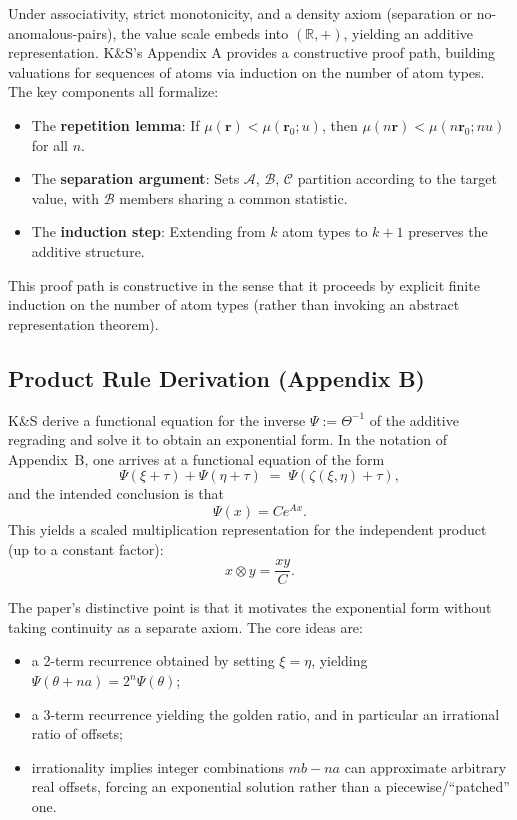 \documentclass[11pt]{article}
\begin{document}
Under associativity, strict monotonicity, and a density axiom (separation or no-anomalous-pairs),
the value scale embeds into $(\mathbb{R}, +)$, yielding an additive representation.
K\&S's Appendix A provides a constructive proof path, building valuations
for sequences of atoms via induction on the number of atom types. The key components
all formalize:

\begin{itemize}[noitemsep]
\item The \textbf{repetition lemma}: If $\mu(\mathbf{r}) < \mu(\mathbf{r}_0; u)$,
then $\mu(n\mathbf{r}) < \mu(n\mathbf{r}_0; nu)$ for all $n$.

\item The \textbf{separation argument}: Sets $\mathcal{A}$, $\mathcal{B}$, $\mathcal{C}$
partition according to the target value, with $\mathcal{B}$ members sharing a common
statistic.

\item The \textbf{induction step}: Extending from $k$ atom types to $k+1$ preserves
the additive structure.
\end{itemize}

This proof path is constructive in the sense that it proceeds by explicit finite induction
on the number of atom types (rather than invoking an abstract representation theorem).

\subsection{Product Rule Derivation (Appendix B)}

K\&S derive a functional equation for the inverse $\Psi := \Theta^{-1}$ of the additive regrading
and solve it to obtain an exponential form.  In the notation of Appendix~B, one arrives at a
functional equation of the form
\[
\Psi(\xi + \tau) + \Psi(\eta + \tau) \;=\; \Psi(\zeta(\xi,\eta) + \tau),
\]
and the intended conclusion is that
\[
\Psi(x) = C e^{Ax}.
\]
This yields a scaled multiplication representation for the independent product (up to a constant
factor):
\[
x \otimes y = \frac{xy}{C}.
\]

The paper’s distinctive point is that it motivates the exponential form without taking continuity as a
separate axiom.  The core ideas are:
\begin{itemize}[noitemsep]
\item a 2-term recurrence obtained by setting $\xi=\eta$, yielding $\Psi(\theta+na)=2^n\Psi(\theta)$;
\item a 3-term recurrence yielding the golden ratio, and in particular an irrational ratio of offsets;
\item irrationality implies integer combinations $mb-na$ can approximate arbitrary real offsets,
forcing an exponential solution rather than a piecewise/``patched'' one.
\end{itemize}
\end{document}
